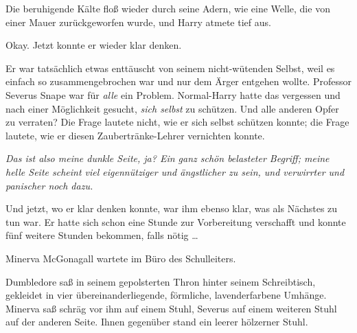 Die beruhigende Kälte floß wieder durch seine Adern, wie eine Welle, die von einer Mauer zurückgeworfen wurde, und Harry atmete tief aus.

Okay. Jetzt konnte er wieder klar denken.

Er war tatsächlich etwas enttäuscht von seinem nicht-wütenden Selbst, weil es einfach so zusammengebrochen war und nur dem Ärger entgehen wollte. Professor Severus Snape war für \emph{alle} ein Problem. Normal-Harry hatte das vergessen und nach einer Möglichkeit gesucht, \emph{sich selbst} zu schützen. Und alle anderen Opfer zu verraten? Die Frage lautete nicht, wie er sich selbst schützen konnte; die Frage lautete, wie er diesen Zaubertränke-Lehrer vernichten konnte.

\emph{Das ist also meine dunkle Seite, ja? Ein ganz schön belasteter Begriff; meine helle Seite scheint viel eigennütziger und ängstlicher zu sein, und verwirrter und panischer noch dazu.}

Und jetzt, wo er klar denken konnte, war ihm ebenso klar, was als Nächstes zu tun war. Er hatte sich schon eine Stunde zur Vorbereitung verschafft und konnte fünf weitere Stunden bekommen, falls nötig …

\later

Minerva McGonagall wartete im Büro des Schulleiters.

Dumbledore saß in seinem gepolsterten Thron hinter seinem Schreibtisch, gekleidet in vier übereinanderliegende, förmliche, lavenderfarbene Umhänge. Minerva saß schräg vor ihm auf einem Stuhl, Severus auf einem weiteren Stuhl auf der anderen Seite. Ihnen gegenüber stand ein leerer hölzerner Stuhl.

